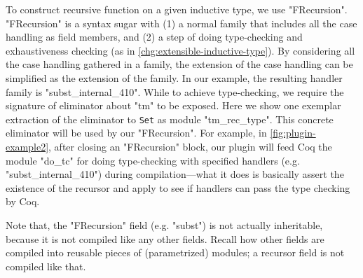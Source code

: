To construct recursive function on a given inductive type, we use "FRecursion". "FRecursion" is a syntax sugar with (1) a normal family that includes all the case handling as field members, and (2) a step of doing type-checking and exhaustiveness checking (as in \ref{chg:extensible-inductive-type}). By considering all the case handling gathered in a family, the extension of the case handling can be simplified as the extension of the family. In our example, the resulting handler family is "subst_internal_410". While to achieve type-checking, we require the signature of eliminator about "tm" to be exposed. Here we show one
exemplar extraction of the eliminator to \texttt{Set} as module
"tm_rec_type". This concrete eliminator will be used by our "FRecursion".
For example, in \cref{fig:plugin-example2}, after closing an "FRecursion" block, our plugin will feed Coq the module "do_tc" for doing type-checking with specified
handlers (e.g. "subst_internal_410") during compilation---what it does is
basically
assert the existence of the recursor and apply to see if handlers can
pass the type checking by Coq.



 

Note that, the "FRecursion" field (e.g. "subst") is not actually
inheritable, because it is not compiled like any other fields.
Recall how other fields are compiled into reusable pieces of
(parametrized) modules; a recursor field is not compiled like that. 

